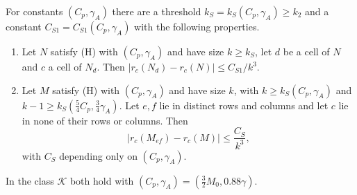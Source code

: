 
\begin{proposicion}\label{prop:menor-lejano}
For constants $(C_p,\gamma_A)$ there are a threshold $k_S=k_S(C_p,\gamma_A)\ge k_2$ and a constant
$C_{S1}=C_{S1}(C_p,\gamma_A)$ with the following properties.
\begin{enumerate}
\item[\textup{(a)}] Let $N$ satisfy \textup{(H)} with $(C_p,\gamma_A)$ and have size $k\ge k_S$, let $d$
be a cell of $N$ and $c$ a cell of $N_d$. Then $|r_c(N_d)-r_c(N)|\le C_{S1}/k^3$.
\item[\textup{(b)}] Let $M$ satisfy \textup{(H)} with $(C_p,\gamma_A)$ and have size $k$, with
$k\ge k_S(C_p,\gamma_A)$ and $k-1\ge k_S(\tfrac54C_p,\tfrac34\gamma_A)$. Let $e,f$ lie in distinct rows
and columns and let $c$ lie in none of their rows or columns. Then
\[
 |r_c(M_{ef})-r_c(M)|\le\frac{C_S}{k^3}, \tag{S}
\]
with $C_S$ depending only on $(C_p,\gamma_A)$.
\end{enumerate}
In the class $\mathcal K$ both hold with $(C_p,\gamma_A)=(\tfrac32M_0,0.88\gamma)$.
\end{proposicion}
